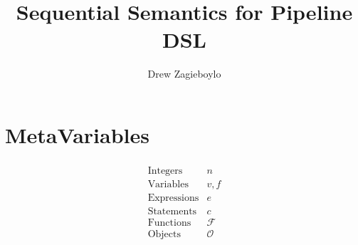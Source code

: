\documentclass{article}
\begin{document}
\title{Sequential Semantics for Pipeline DSL}
\author{Drew Zagieboylo}
\maketitle

\section{MetaVariables}
\begin{align*}
  \begin{array}{lc}
    \mbox{Integers} & n \\
    \mbox{Variables} & v,f\\
    \mbox{Expressions} & e\\
    \mbox{Statements} & c\\
    \mbox{Functions} & \mathcal{F}\\
    \mbox{Objects} & \mathcal{O}\\
  \end{array}
\end{align*}
\end{document}
